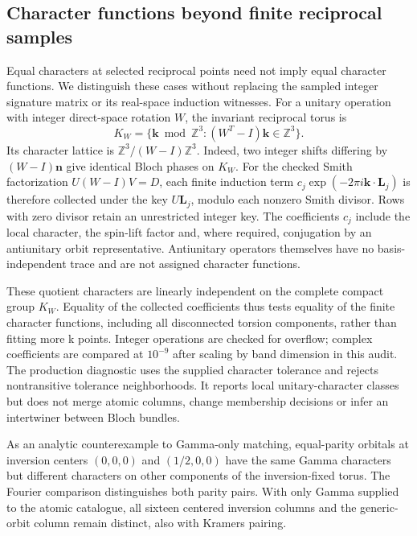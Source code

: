 \documentclass[11pt]{article}
\begin{document}
\subsection{Character functions beyond finite reciprocal samples}
Equal characters at selected reciprocal points need not imply equal
character functions. We distinguish these cases without replacing
the sampled integer signature matrix or its real-space induction
witnesses. For a unitary operation with integer direct-space rotation
$W$, the invariant reciprocal torus is
\begin{equation}
 K_W=\{\mathbf k\bmod\mathbb Z^3:
          (W^T-I)\mathbf k\in\mathbb Z^3\}.
\end{equation}
Its character lattice is $\mathbb Z^3/(W-I)\mathbb Z^3$.
Indeed, two integer shifts differing by $(W-I)\mathbf n$ give
identical Bloch phases on $K_W$. For the checked Smith factorization
$U(W-I)V=D$, each finite induction term
$c_j\exp(-2\pi i\mathbf k\cdot\mathbf L_j)$ is therefore collected
under the key $U\mathbf L_j$, modulo each nonzero Smith divisor.
Rows with zero divisor retain an unrestricted integer key.
The coefficients $c_j$ include the local character, the spin-lift
factor and, where required, conjugation by an antiunitary orbit
representative. Antiunitary operators themselves have no
basis-independent trace and are not assigned character functions.

These quotient characters are linearly independent on the complete
compact group $K_W$. Equality of the collected coefficients thus
tests equality of the finite character functions, including all
disconnected torsion components, rather than fitting more k points.
Integer operations are checked for overflow; complex coefficients
are compared at $10^{-9}$ after scaling by band dimension in this
audit. The production diagnostic uses the supplied character
tolerance and rejects nontransitive tolerance neighborhoods.
It reports local unitary-character classes but does not merge
atomic columns, change membership decisions or infer an intertwiner
between Bloch bundles.

As an analytic counterexample to Gamma-only matching, equal-parity
orbitals at inversion centers $(0,0,0)$ and $(1/2,0,0)$ have the
same Gamma characters but different characters on other components
of the inversion-fixed torus. The Fourier comparison distinguishes
both parity pairs. With only Gamma supplied to the atomic catalogue,
all sixteen centered inversion columns and the generic-orbit column
remain distinct, also with Kramers pairing.
\end{document}
